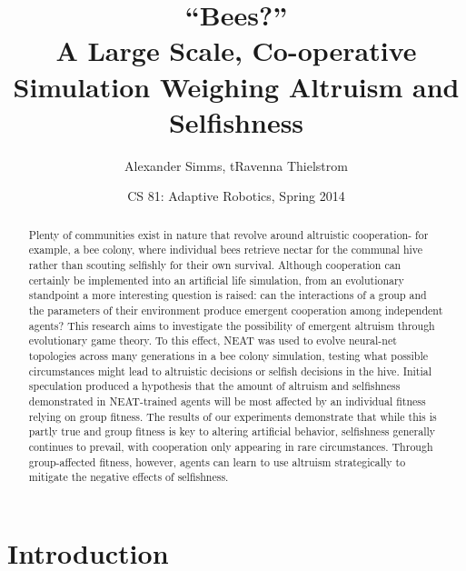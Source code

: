 \documentclass[11pt, letter]{article}
\title  {``Bees?''\\ A Large Scale, Co-operative Simulation 
         Weighing Altruism and Selfishness}
\author {Alexander Simms, tRavenna Thielstrom}
\date   {CS 81: Adaptive Robotics, Spring 2014}
\begin{document}
	\maketitle

	\begin{abstract}


		Plenty of communities exist in nature that revolve around altruistic cooperation- for example, a bee colony, where individual bees retrieve nectar for the communal hive rather than scouting selfishly for their own survival. Although cooperation can certainly be implemented into an artificial life simulation, from an evolutionary standpoint a more interesting question is raised: can the interactions of a group and the parameters of their environment produce emergent cooperation among independent agents? This research aims to investigate the possibility of emergent altruism through evolutionary game theory. To this effect, NEAT was used to evolve neural-net topologies across many generations in a bee colony simulation, testing what possible circumstances might lead to altruistic decisions or selfish decisions in the hive. Initial speculation produced a hypothesis that the amount of altruism and selfishness demonstrated in NEAT-trained agents will be most affected by an individual fitness relying on group fitness. The results of our experiments demonstrate that while this is partly true and group fitness is key to altering artificial behavior, selfishness generally continues to prevail, with cooperation only appearing in rare circumstances. Through group-affected fitness, however, agents can learn to use altruism strategically to mitigate the negative effects of selfishness.



	\end{abstract}

	\section{Introduction} %
	\label{sec:introduction}
\end{document}
